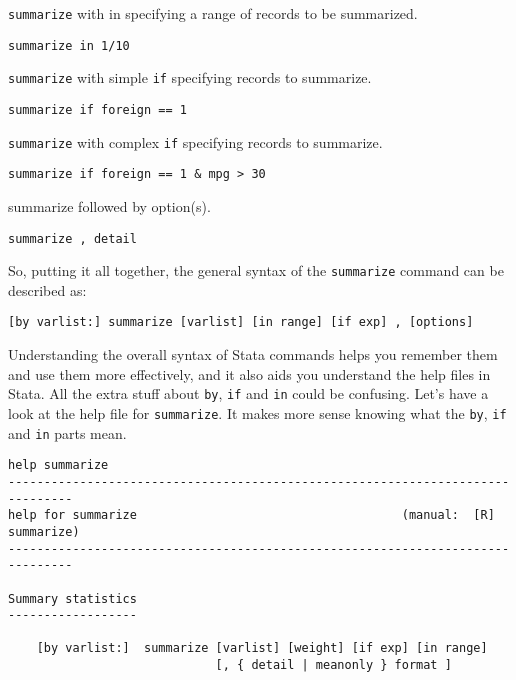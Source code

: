 \lstinline{summarize} with in specifying a range of records to be summarized.

\begin{lstlisting}
summarize in 1/10
\end{lstlisting}

\lstinline{summarize} with simple \lstinline{if} specifying records to summarize.

\begin{lstlisting}
summarize if foreign == 1
\end{lstlisting}

\lstinline{summarize} with complex \lstinline{if} specifying records to summarize.

\begin{lstlisting}
summarize if foreign == 1 & mpg > 30
\end{lstlisting}

summarize followed by option(s).

\begin{lstlisting}
summarize , detail
\end{lstlisting}

So, putting it all together, the general syntax of the \lstinline{summarize} command can be described as:


\begin{lstlisting}
[by varlist:] summarize [varlist] [in range] [if exp] , [options]
\end{lstlisting}

Understanding the overall syntax of Stata commands helps you remember them and use them more effectively, and it also aids you understand the help files in Stata. All the extra stuff about \lstinline{by}, \lstinline{if} and \lstinline{in} could be confusing. Let's have a look at the help file for \lstinline{summarize}. It makes more sense knowing what the \lstinline{by}, \lstinline{if} and \lstinline{in} parts mean.

\begin{lstlisting}
help summarize
-------------------------------------------------------------------------------
help for summarize                                     (manual:  [R] summarize)
-------------------------------------------------------------------------------

Summary statistics
------------------

    [by varlist:]  summarize [varlist] [weight] [if exp] [in range]
                             [, { detail | meanonly } format ]
\end{lstlisting}

